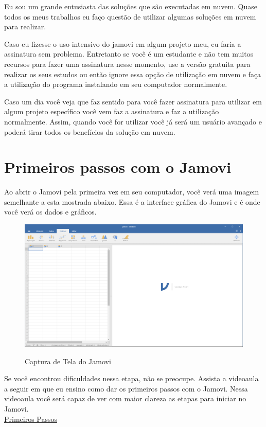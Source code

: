 Eu sou um grande entusiasta das soluções que são executadas em nuvem. Quase todos os meus trabalhos eu faço questão de utilizar algumas soluções em nuvem para realizar.

Caso eu fizesse o uso intensivo do jamovi em algum projeto meu, eu faria a assinatura sem problema. Entretanto se você é um estudante e não tem muitos recursos para fazer uma assinatura nesse momento, use a versão gratuita para realizar os seus estudos ou então ignore essa opção de utilização em nuvem e faça a utilização do programa instalando em seu computador normalmente.

Caso um dia você veja que faz sentido para você fazer assinatura para utilizar em algum projeto específico você vem faz a assinatura e faz a utilização normalmente. Assim, quando você for utilizar você já será um usuário avançado e poderá tirar todos os benefícios da solução em nuvem.

\section{Primeiros passos com o Jamovi}

Ao abrir o Jamovi pela primeira vez em seu computador, você verá uma imagem semelhante a esta mostrada abaixo. Essa é a interface gráfica do Jamovi e é onde você verá os dados e gráficos.

\begin{figure}[H]
  \centering
  \caption{Captura de Tela do Jamovi}
  \includegraphics[width=\textwidth]{imagens/cap_1/captura_tela_jamovi.png}
  \label{fig:captura_tela_jamovi}
\end{figure}

\begin{tcolorbox}[colback=white,colframe=green!50!black,title= Dica de Conteúdo]
  Se você encontrou dificuldades nessa etapa, não se preocupe. Assista a videoaula a seguir em que eu ensino como dar os primeiros passos com o Jamovi. Nessa videoaula você será capaz de ver com maior clareza as etapas para iniciar no Jamovi.\\
  \faYoutube{} \href{https://www.youtube.com/watch?v=bV9hlHPLe5I&t=5s}{Primeiros Passos}
\end{tcolorbox}

